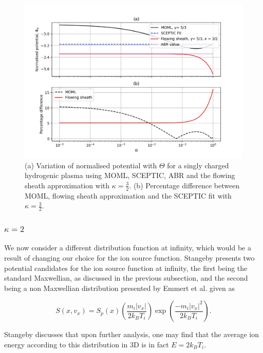 \documentclass{article}
\begin{document}
\begin{figure}[H]
\centering
\includegraphics[width=\linewidth]{Output/MOMLvsFS_kappa1_5.jpeg}
\caption{(a) Variation of normalised potential with $\Theta$ for a singly charged hydrogenic plasma using MOML, SCEPTIC,
ABR and the flowing sheath approximation with $\kappa = \frac{3}{2}$. (b) Percentage difference between MOML, flowing 
sheath approximation and the SCEPTIC fit with $\kappa = \frac{3}{2}$.}
\label{MOMLvsFS_kappa_1_5} 
\end{figure}

\newpage 

\subsubsection{$\kappa = 2$}

We now consider a different distribution function at infinity, which would be a result of changing our choice for the ion
source function. Stangeby presents two potential candidates for the ion source function at infinity, the first being 
the standard Maxwellian, as discussed in the previous subsection, and the second being a non Maxwellian distribution presented by Emmert et al. \cite{kappa2} given 
as

\begin{equation}\label{eq:DistFunc}
S(x,v_x) = S_p(x) \left(\frac{m_i |v_x|}{2k_B T_i}\right) \exp{\left(\frac{- m_i |v_x|^2}{2k_B T_i}\right)}.
\end{equation}

\smallskip

Stangeby discusses that upon further analysis, one may find that the average ion energy according to this 
distribution in 3D is in fact $E = 2k_B T_i$.
\end{document}

